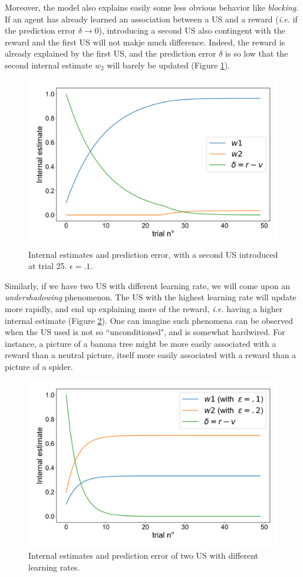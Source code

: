 \documentclass{article}
\begin{document}
Moreover, the model also explains easily some less obvious behavior like \textit{blocking}. If an agent has already learned an association between a US and a reward (\textit{i.e.} if the prediction error $\delta \rightarrow 0$), introducing a second US also contingent with the reward and the first US will not makje much difference. Indeed, the reward is already explained by the first US, and the prediction error $\delta$ is so low that the second internal estimate $w_2$ will barely be updated (Figure \ref{fig:fig4}).

\begin{figure}[H]
\centering
\includegraphics[width=.8\linewidth]{fig2_report6.png}
\caption[growing population]{Internal estimates and prediction error, with a second US introduced at trial 25. $\epsilon = .1$.}\label{fig:fig4}
\end{figure}

Similarly, if we have two US with different learning rate, we will come upon an \textit{undershadowing} phenomenon. The US with the highest learning rate will update more rapidly, and end up explaining more of the reward, \textit{i.e.} having a higher internal estimate (Figure \ref{fig:fig5}). One can imagine such phenomena can be observed when the US used is not so ``unconditioned", and is somewhat hardwired. For instance, a picture of a banana tree might be more easily associated with a reward than a neutral picture, itself more easily associated with a reward than a picture of a spider.

\begin{figure}[H]
\centering
\includegraphics[width=.8\linewidth]{fig2_report7.png}
\caption[growing population]{Internal estimates and prediction error of two US with different learning rates.}\label{fig:fig5}
\end{figure}
\end{document}
